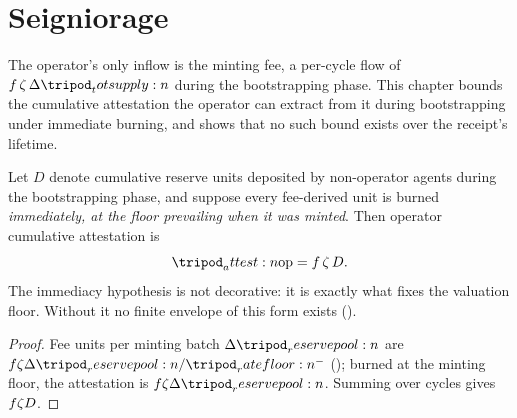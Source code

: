 \documentclass[../main.tex]{subfiles}
\begin{document}
%
%
%

\section{Seigniorage}
\label{sec:attestation:seigniorage}

The operator's only inflow is the minting fee, a per-cycle flow of $\feeflow$ during the
bootstrapping phase. This chapter bounds the cumulative attestation the operator can extract
from it during bootstrapping under immediate burning, and shows that no such bound exists
over the receipt's lifetime.

\begin{theorem}
    \label{thm:seigniorage:bootstrapping-bound}
    Let $D$ denote cumulative reserve units deposited by non-operator agents during the
    bootstrapping phase, and suppose every fee-derived \liveclass{} unit is burned
    \emph{immediately, at the floor prevailing when it was minted}. Then operator cumulative
    attestation is
    \[
        \attest{\opidx} = \feerate\,\livesplit\,D.
    \]
    The immediacy hypothesis is not decorative: it is exactly what fixes the valuation
    floor. Without it no finite envelope of this form exists
    ().
\end{theorem}
\begin{proof}
    Fee units per minting batch $\Delta\reservepool{}$ are
    $\feerate\livesplit\Delta\reservepool{}/\ratefloor{}^{-}$
    (); burned at the minting floor, the attestation
    is $\feerate\livesplit\Delta\reservepool{}$. Summing over cycles gives
    $f\zeta D$.
\end{proof}
\end{document}
